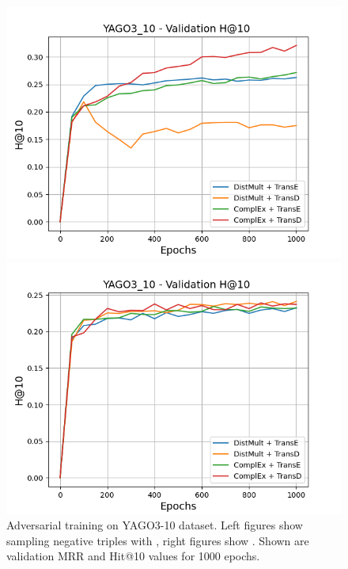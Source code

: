 \begin{figure}[H]
\begin{minipage}{.45\textwidth}
      \includegraphics[width=0.9\linewidth]{figures/results/gan_train/not_pretrained/uncertainty/max/entropy/yago3_10/1k_epochs/uncertainty_yago3_10_hit10.png}
    \end{minipage}%
    \begin{minipage}{.45\textwidth}
      \centering
      \includegraphics[width=0.9\linewidth]{figures/results/gan_train/not_pretrained/uncertainty/max_distribution/entropy/yago3_10/1k_epochs/uncertainty_yago3_10_hit10.png}
    \end{minipage}%
    \caption{Adversarial training on \textsc{YAGO3-10} dataset. 
    Left figures show sampling negative triples with \usmax, right figures show \ussoftmax.
    Shown are validation MRR and Hit@10 values for 1000 epochs.}
    \label{fig:advtrain_yago3_10_usmax_ussoftmax}
\end{figure}

